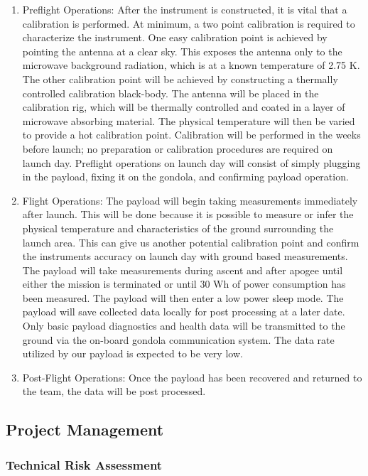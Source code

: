 \documentclass[12pt]{article}
\begin{document}
\begin{enumerate}
    \item Preflight Operations: After the instrument is constructed, it is vital that a calibration is performed. At minimum, a two point calibration is required to characterize the instrument. One easy calibration point is achieved by pointing the antenna at a clear sky. This exposes the antenna only to the microwave background radiation, which is at a known temperature of 2.75 \textdegree K. The other calibration point will be achieved by constructing a thermally controlled calibration black-body. The antenna will be placed in the calibration rig, which will be thermally controlled and coated in a layer of microwave absorbing material. The physical temperature will then be varied to provide a hot calibration point. Calibration will be performed in the weeks before launch; no preparation or calibration procedures are required on launch day. Preflight operations on launch day will consist of simply plugging in the payload, fixing it on the gondola, and confirming payload operation.
    \item Flight Operations: The payload will begin taking measurements immediately after launch. This will be done because it is possible to measure or infer the physical temperature and characteristics of the ground surrounding the launch area. This can give us another potential calibration point and confirm the instruments accuracy on launch day with ground based measurements. The payload will take measurements during ascent and after apogee until either the mission is terminated or until 30 Wh of power consumption has been measured. The payload will then enter a low power sleep mode. The payload will save collected data locally for post processing at a later date. Only basic payload diagnostics and health data will be transmitted to the ground via the on-board gondola communication system. The data rate utilized by our payload is expected to be very low.
    \item Post-Flight Operations: Once the payload has been recovered and returned to the team, the data will be post processed.
\end{enumerate}

\subsection{Project Management}

\subsubsection{Technical Risk Assessment}
\end{document}
